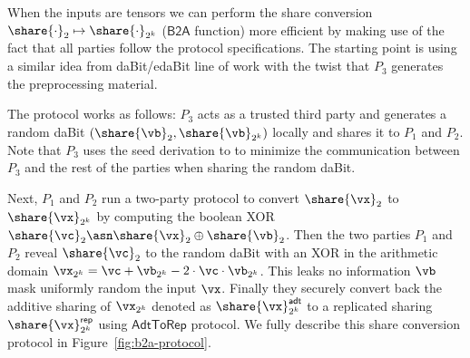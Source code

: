 When the inputs are tensors we can perform the share conversion $\share{\cdot}_2
\mapsto \share{\cdot}_{2^k}$ ($\mathsf{B2A}$ function)
more efficient by making use of the fact that all parties
follow the protocol specifications. The starting point is using a similar idea
from daBit/edaBit \cite{INDOCRYPT:RotWoo19,C:EGKRS20}
line of work with the twist that $P_3$ generates the preprocessing
material.

The protocol works as follows: $P_3$ acts as a trusted third party and generates
a random daBit $(\share{\vb}_2,
\share{\vb}_{2^k})$ locally and shares it to $P_1$ and $P_2$. Note that $P_3$
uses the seed derivation to to minimize the communication between $P_3$ and the
rest of the parties when sharing the random daBit.

Next, $P_1$ and $P_2$ run a two-party protocol to convert $\share{\vx}_2$ to
$\share{\vx}_{2^k}$ by computing the boolean XOR $\share{\vc}_2 \asn
\share{\vx}_2 \oplus \share{\vb}_2$.
Then the two parties $P_1$ and $P_2$ reveal $\share{\vc}_2$
to the random daBit with an XOR in the arithmetic domain
$\vx_{2^k} = \vc + \vb_{2^k} - 2 \cdot \vc \cdot \vb_{2^k}$.
This leaks no information $\vb$ mask uniformly random the input $\vx$.
Finally they securely convert back the additive sharing of $\vx_{2^k}$
denoted as $\share{\vx}^\mathsf{adt}_{2^k}$ to a replicated sharing
$\share{\vx}^\mathsf{rep}_{2^k}$ using $\mathsf{AdtToRep}$ protocol. We fully
describe this share conversion protocol in Figure~\ref{fig:b2a-protocol}.




% 
